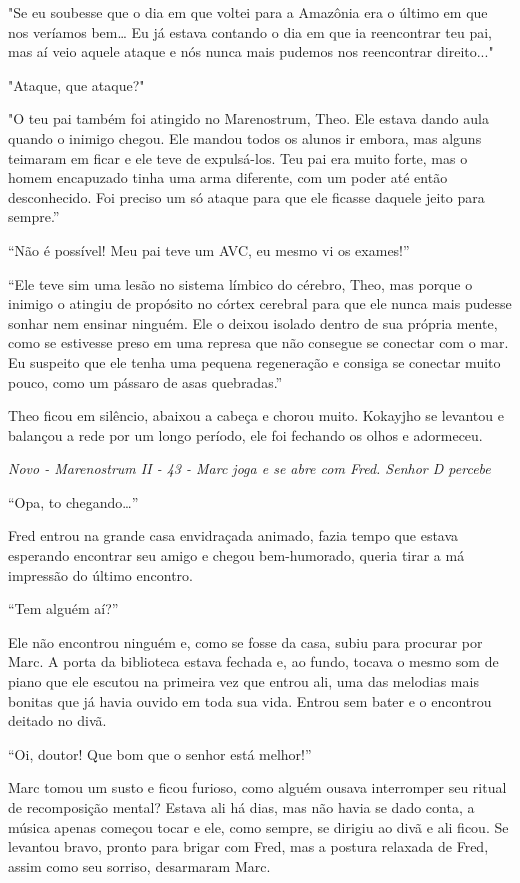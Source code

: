 "Se eu soubesse que o dia em que voltei para a Amazônia era o último em
que nos veríamos bem\ldots{} Eu já estava contando o dia em que ia
reencontrar teu pai, mas aí veio aquele ataque e nós nunca mais pudemos
nos reencontrar direito..."

"Ataque, que ataque?"

"O teu pai também foi atingido no Marenostrum, Theo. Ele estava dando
aula quando o inimigo chegou. Ele mandou todos os alunos ir embora, mas
alguns teimaram em ficar e ele teve de expulsá-los. Teu pai era muito
forte, mas o homem encapuzado tinha uma arma diferente, com um poder até
então desconhecido. Foi preciso um só ataque para que ele ficasse
daquele jeito para sempre.''

``Não é possível! Meu pai teve um AVC, eu mesmo vi os exames!''

``Ele teve sim uma lesão no sistema límbico do cérebro, Theo, mas porque
o inimigo o atingiu de propósito no córtex cerebral para que ele nunca
mais pudesse sonhar nem ensinar ninguém. Ele o deixou isolado dentro de
sua própria mente, como se estivesse preso em uma represa que não
consegue se conectar com o mar. Eu suspeito que ele tenha uma pequena
regeneração e consiga se conectar muito pouco, como um pássaro de asas
quebradas.''

Theo ficou em silêncio, abaixou a cabeça e chorou muito. Kokayjho se
levantou e balançou a rede por um longo período, ele foi fechando os
olhos e adormeceu.

\asterisc

\emph{Novo - Marenostrum II - 43 - Marc joga e se abre com Fred. Senhor
D percebe}

``Opa, to chegando\ldots{}''

Fred entrou na grande casa envidraçada animado, fazia tempo que estava
esperando encontrar seu amigo e chegou bem-humorado, queria tirar a má
impressão do último encontro.

``Tem alguém aí?''

Ele não encontrou ninguém e, como se fosse da casa, subiu para procurar
por Marc. A porta da biblioteca estava fechada e, ao fundo, tocava o
mesmo som de piano que ele escutou na primeira vez que entrou ali, uma
das melodias mais bonitas que já havia ouvido em toda sua vida. Entrou
sem bater e o encontrou deitado no divã.

``Oi, doutor! Que bom que o senhor está melhor!''

Marc tomou um susto e ficou furioso, como alguém ousava interromper seu
ritual de recomposição mental? Estava ali há dias, mas não havia se dado
conta, a música apenas começou tocar e ele, como sempre, se dirigiu ao
divã e ali ficou. Se levantou bravo, pronto para brigar com Fred, mas a
postura relaxada de Fred, assim como seu sorriso, desarmaram Marc.

